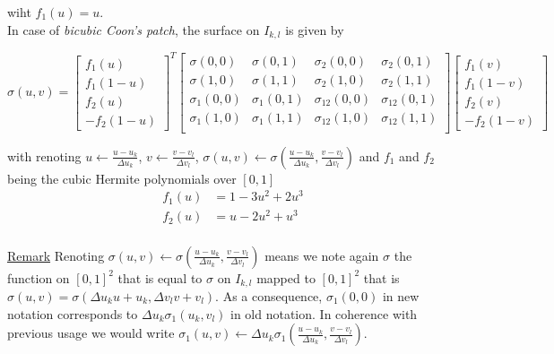 \documentclass[a4paper, 11pt]{article}
\begin{document}
wiht $f_1(u) = u$. \\

In case of \emph{bicubic Coon's patch}, the surface on $I_{k,l}$ is given by

\begin{equation}
  \sigma(u,v) = \begin{bmatrix} f_1(u) \\ f_1(1-u) \\ f_2(u) \\ -f_2(1-u) \end{bmatrix}^T
  \begin{bmatrix}
    \sigma(0,0) & \sigma(0,1) & \sigma_2(0,0) & \sigma_2(0,1) \\
    \sigma(1,0) & \sigma(1,1) & \sigma_2(1,0) & \sigma_2(1,1) \\
    \sigma_1(0,0) & \sigma_1(0,1) & \sigma_{12}(0,0) & \sigma_{12}(0,1) \\
    \sigma_1(1,0) & \sigma_1(1,1) & \sigma_{12}(1,0) & \sigma_{12}(1,1) \\
  \end{bmatrix}
  \begin{bmatrix} f_1(v) \\ f_1(1-v) \\  f_2(v) \\ - f_2(1-v) \end{bmatrix}
\end{equation}


with renoting $u \leftarrow \frac{u-u_k}{\Delta u_k}$, $v \leftarrow \frac{v-v_l}{\Delta v_l}$, $\sigma(u,v) \leftarrow 
\sigma(\frac{u-u_k}{\Delta u_k}, \frac{v-v_l}{\Delta v_l})$ and $f_1$ and $f_2$ being the cubic Hermite polynomials over 
$[0,1]$
\begin{align*}
  f_1(u) &= 1 - 3u^2 + 2u^3 \\
  f_2(u) &= u - 2u^2 + u^3 \\
\end{align*}

\underline{Remark} Renoting $\sigma(u,v) \leftarrow \sigma(\frac{u-u_k}{\Delta u_k}, \frac{v-v_l}{\Delta v_l})$ means we 
note again $\sigma$ the function on ${[0,1]}^2$ that is equal to $\sigma$ on $I_{k,l}$ mapped to ${[0,1]}^2$ that is 
$\sigma(u,v) = \sigma(\Delta u_k u + u_k, \Delta v_l v + v_l)$. As a consequence, $\sigma_1(0,0)$ in new notation 
corresponds to $ \Delta u_k \sigma_1(u_k, v_l)$ in old notation. In coherence with previous usage we would write 
$\sigma_1(u,v) \leftarrow \Delta u_k \sigma_1(\frac{u-u_k}{\Delta u_k}, \frac{v-v_l}{\Delta v_l})$.  \\ 
\end{document}
